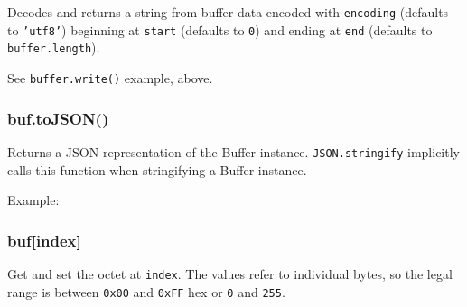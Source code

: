 Decodes and returns a string from buffer data encoded with
\texttt{encoding} (defaults to \texttt{'utf8'}) beginning at
\texttt{start} (defaults to \texttt{0}) and ending at \texttt{end}
(defaults to \texttt{buffer.length}).

See \texttt{buffer.write()} example, above.

\subsubsection{buf.toJSON()}\label{buf.tojson}

Returns a JSON-representation of the Buffer instance.
\texttt{JSON.stringify} implicitly calls this function when stringifying
a Buffer instance.

Example:

\begin{Shaded}
\begin{Highlighting}[]
  \NormalTok{(}\NormalTok{);}
 


 
      \NormalTok{=== }
       \NormalTok{(}\NormalTok{)}
  \NormalTok{\});}

\end{Highlighting}
\end{Shaded}

\subsubsection{buf{[}index{]}}\label{bufindex}

Get and set the octet at \texttt{index}. The values refer to individual
bytes, so the legal range is between \texttt{0x00} and \texttt{0xFF} hex
or \texttt{0} and \texttt{255}.

